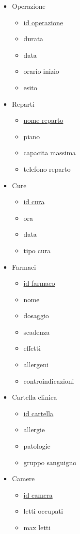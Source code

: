 \documentclass[a4paper, 10pt]{article}
\begin{document}
\begin{spacing}{0.1}
\begin{itemize}
\item Operazione
\begin{itemize}
    \item \underline{id operazione}
    \item durata
    \item data
    \item orario inizio
    \item esito
\end{itemize}

\item Reparti
\begin{itemize}
    \item \underline{nome reparto}
    \item piano
    \item capacita massima
    \item telefono reparto
\end{itemize}

\item Cure
\begin{itemize}
    \item \underline{id cura}
    \item ora 
    \item data
    \item tipo cura
\end{itemize}

\item Farmaci
\begin{itemize}
    \item \underline{id farmaco}
    \item nome
    \item dosaggio
    \item scadenza
    \item effetti
    \item allergeni
    \item controindicazioni
\end{itemize}

\item Cartella clinica
\begin{itemize}
    \item \underline{id cartella}
    \item allergie
    \item patologie
    \item gruppo sanguigno
\end{itemize}

\item Camere 
\begin{itemize}
    \item \underline{id camera}
    \item letti occupati
    \item max letti
\end{itemize}


\end{itemize}
\end{spacing}
\end{document}
